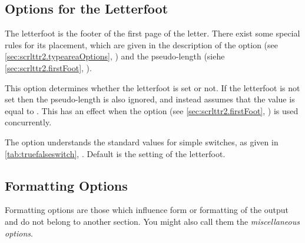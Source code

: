 %
%

\subsection{Options for the Letterfoot}
\label{sec:scrlttr2.footoptions}

The letterfoot is the footer of the first page of the letter. There
exist some special rules for its placement, which are given in the
description of the option
 (see
\autoref{sec:scrlttr2.typeareaOptions},
) and the
pseudo-length 
(siehe \autoref{sec:scrlttr2.firstFoot},
).

\begin{Declaration}
\end{Declaration}
%
This option determines whether the
letterfoot is set or not. If the letterfoot is not set then the
pseudo-length  is also ignored, and instead
 assumes that the value is equal to
.  This has an effect when the option
 (see \autoref{sec:scrlttr2.firstFoot},
) is used
concurrently.
  
The option understands the standard values for simple switches, as
given in \autoref{tab:truefalseswitch},
. Default is the setting
of the letterfoot.
%


\subsection{Formatting Options}
\label{sec:scrlttr2.formatingOptions}

Formatting options are those which influence form or formatting of the
output and do not belong to another section. You might also call them
the \emph{miscellaneous options}.


